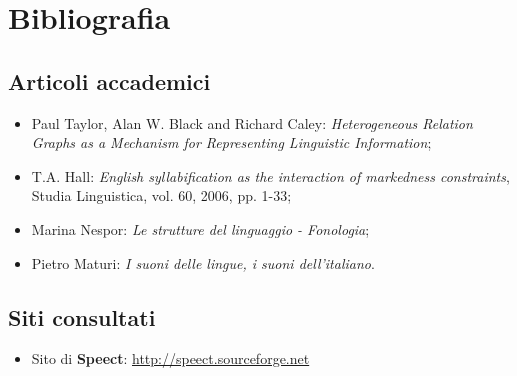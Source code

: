 

\cleardoublepage
\chapter{Bibliografia}
\section{Articoli accademici}
   \begin{itemize}
       \item Paul Taylor, Alan W. Black and Richard Caley: \textit{Heterogeneous Relation Graphs as a Mechanism for Representing Linguistic Information};
       \item T.A. Hall: \textit{English syllabification as the interaction of markedness constraints}, Studia Linguistica, vol. 60, 2006, pp. 1-33;
       \item Marina Nespor: \textit{Le strutture del linguaggio - Fonologia};
       \item Pietro Maturi: \textit{I suoni delle lingue, i suoni dell'italiano}.
   \end{itemize}
\section{Siti consultati}
   \begin{itemize}
        \item Sito di \textbf{Speect}: \url{http://speect.sourceforge.net}
   \end{itemize}


